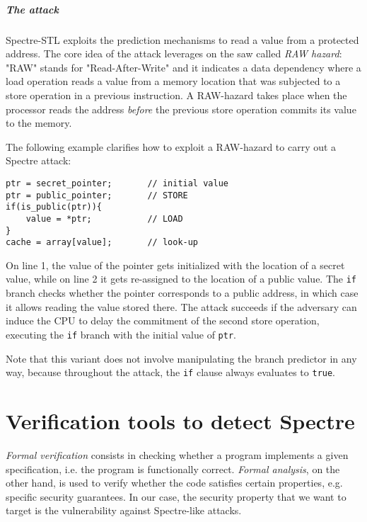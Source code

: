 \documentclass[target=mst,aauheader=aics]{thud}
\theoremstyle{definition}
\begin{document}
	\paragraph{The attack} Spectre-STL exploits the prediction mechanisms to read a value from a protected address. The core idea of the attack leverages on the saw called \textit{RAW hazard}: "RAW" stands for "Read-After-Write" and it indicates a data dependency where a load operation reads a value from a memory location that was subjected to a store operation in a previous instruction. A RAW-hazard takes place when the processor reads the address \textit{before} the previous store operation commits its value to the memory.
	
	The following example clarifies how to exploit a RAW-hazard to carry out a Spectre attack:
	
	\vspace{3mm}
	\begin{minipage}{.6\textwidth}
	\begin{lstlisting}
ptr = secret_pointer;		// initial value
ptr = public_pointer;		// STORE
if(is_public(ptr)){	
	value = *ptr;			// LOAD
}
cache = array[value];		// look-up
	\end{lstlisting}
	\end{minipage}

	On line 1, the value of the pointer gets initialized with the location of a secret value, while on line 2 it gets re-assigned to the location of a public value. The \texttt{if} branch checks whether the pointer corresponds to a public address, in which case it allows reading the value stored there. The attack succeeds if the adversary can induce the CPU to delay the commitment of the second store operation, executing the \texttt{if} branch with the initial value of \texttt{ptr}.
	
	Note that this variant does not involve manipulating the branch predictor in any way, because throughout the attack, the \texttt{if} clause always evaluates to \texttt{true}.
	
	\chapter{Verification tools to detect Spectre}\label{chapter:verification}
	
	\textit{Formal verification} consists in checking whether a program implements a given specification, i.e. the program is functionally correct. \textit{Formal analysis}, on the other hand, is used to verify whether the code satisfies certain properties, e.g. specific security guarantees. In our case, the security property that we want to target is the vulnerability against Spectre-like attacks. 
	
\end{document}
